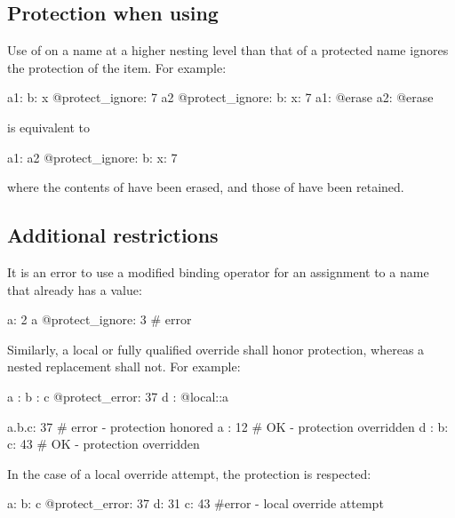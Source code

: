 \documentclass{memarticle}
\makeatletter
\newcommand{\aterase}{\fclcode{@erase}\xspace}
\makeatother
\begin{document}
\subsection{Protection when using \aterase}

Use of \aterase on a name at a higher nesting level than that of a
protected name ignores the protection of the item.  For example:
%
\Needspace{0.34in}
\begin{fcllisting}[texcl,escapechar=`]
a1: { b: { x @protect_ignore: 7 } }
a2 @protect_ignore: { b: { x: 7 } }
a1: @erase
a2: @erase
\end{fcllisting}
%
is equivalent to
%
\Needspace{0.34in}
\begin{fcllisting}[texcl,escapechar=`]
a1: {}
a2 @protect_ignore: { b: { x: 7 } }
\end{fcllisting}
%
where the contents of  have been erased, and those of
 have been retained.

\subsection{Additional restrictions}

It is an error to use a modified binding operator for an assignment to
a name that already has a value:
%
\Needspace{0.34in}
\begin{fcllisting}[texcl,escapechar=`]
a: 2
a @protect_ignore: 3 # error
\end{fcllisting}
%

Similarly, a local or fully qualified override shall honor protection,
whereas a nested replacement shall not. For example:
%
\Needspace{0.34in}
\begin{fcllisting}[texcl,escapechar=`]
a    : { b : { c @protect_error: 37 } }
d    : @local::a

a.b.c: 37               # error - protection honored
a    : 12               # OK    - protection overridden
d    : { b: { c: 43 } } # OK    - protection overridden
\end{fcllisting}

In the case of a local override attempt, the protection is respected:
%
\Needspace{0.34in}
\begin{fcllisting}[texcl,escapechar=`]
a: {
   b: {
      c @protect_error: 37
      d: 31
      c: 43  #error - local override attempt
   }
}
\end{fcllisting}

\end{document}
